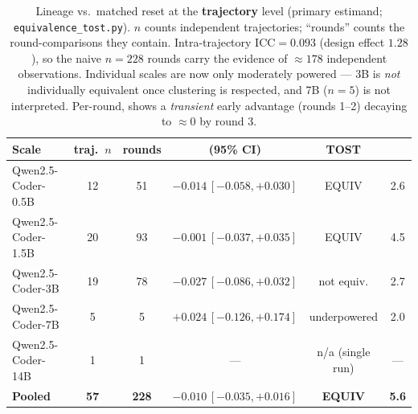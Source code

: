 
\begin{table}[H]\centering\small
\begin{tabular}{lccccc}
\toprule
Scale & traj.\ $n$ & rounds & \lmr{} (95\% CI) & TOST & \bfz{} \\
\midrule
Qwen2.5-Coder-0.5B & 12 & 51 & $-0.014\,[-0.058,+0.030]$ & EQUIV & 2.6 \\
Qwen2.5-Coder-1.5B & 20 & 93 & $-0.001\,[-0.037,+0.035]$ & EQUIV & 4.5 \\
Qwen2.5-Coder-3B   & 19 & 78 & $-0.027\,[-0.086,+0.032]$ & not equiv. & 2.7 \\
Qwen2.5-Coder-7B   & 5  & 5  & $+0.024\,[-0.126,+0.174]$ & underpowered & 2.0 \\
Qwen2.5-Coder-14B  & 1  & 1  & --- & n/a (single run) & --- \\
\midrule
\textbf{Pooled}    & \textbf{57} & \textbf{228} & $\mathbf{-0.010\,[-0.035,+0.016]}$ & \textbf{EQUIV} & \textbf{5.6} \\
\bottomrule
\end{tabular}
\caption{Lineage vs.\ matched reset at the \textbf{trajectory} level (primary estimand;
\texttt{equivalence\_tost.py}). $n$ counts independent trajectories; ``rounds'' counts the round-comparisons
they contain. Intra-trajectory ICC${=}0.093$ (design effect $1.28$), so the naive $n{=}228$ rounds carry the
evidence of ${\approx}178$ independent observations. Individual scales are now only moderately powered --- 3B
is \emph{not} individually equivalent once clustering is respected, and 7B ($n{=}5$) is not interpreted.
Per-round, \lmr{} shows a \emph{transient} early advantage (rounds 1--2) decaying to $\approx0$ by round 3.}
\end{table}

